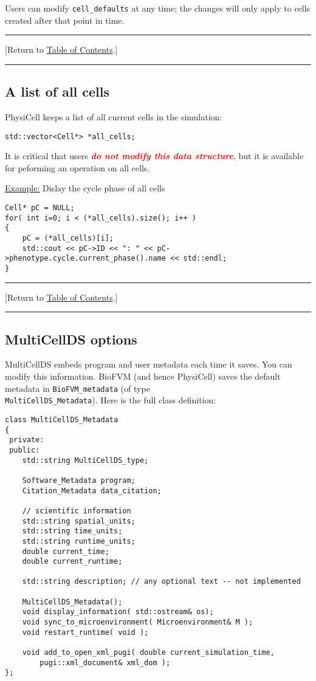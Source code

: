 \documentclass[12pt]{article}
\renewcommand{\v}{\verb}
\newcommand{\red}[1]{\textcolor{red}{#1}}
\newcommand{\blue}[1]{\textcolor{blue}{#1}}
\newcommand{\DONE}{}%
\newcommand{\TOClink}{\begin{center}\hrule\vskip-10pt\phantom{.}\hfill[Return to \hyperlink{TOC}{Table of Contents}.]\hfill\phantom{.}\vskip3pt\hrule\end{center}}
\begin{document}
Users can modify \v|cell_defaults| at any time; the changes will only 
apply to cells created after that point in time.  

\TOClink 

\subsection{A list of all cells}
\label{sec:All_Cells}
PhysiCell keeps a list of all current cells in the simulation: 

\begin{verbatim}
std::vector<Cell*> *all_cells;
\end{verbatim}

It is critical that users \emph{\red{\textbf{do not modify this data structure}}}, but it 
is available for peforming an operation on all cells. 

\underline{Example:} Dislay the cycle phase of all cells
\begin{verbatim}
Cell* pC = NULL; 
for( int i=0; i < (*all_cells).size(); i++ )
{
    pC = (*all_cells)[i]; 
    std::cout << pC->ID << ": " << pC->phenotype.cycle.current_phase().name << std::endl; 
}
\end{verbatim}

\TOClink 



\subsection{MultiCellDS options \DONE}
\label{sec:MultiCellDS_Options}
MultiCellDS embeds program and user metadata each time it saves. You can 
modify this information. BioFVM (and hence PhysiCell) saves the default 
metadata in \v|BioFVM_metadata| (of type \\
\v|MultiCellDS_Metadata|). Here is the full class definition: 
%
\begin{verbatim}
class MultiCellDS_Metadata
{
 private:
 public:
    std::string MultiCellDS_type; 

    Software_Metadata program; 
    Citation_Metadata data_citation; 

    // scientific information  
    std::string spatial_units; 
    std::string time_units;
    std::string runtime_units; 
    double current_time; 
    double current_runtime; 
    
    std::string description; // any optional text -- not implemented 

    MultiCellDS_Metadata();    
    void display_information( std::ostream& os); 
    void sync_to_microenvironment( Microenvironment& M );  
    void restart_runtime( void );  

    void add_to_open_xml_pugi( double current_simulation_time, 
        pugi::xml_document& xml_dom ); 
};
\end{verbatim}
\end{document}
